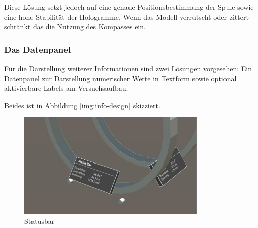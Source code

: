 Diese Lösung setzt jedoch auf eine genaue Positionsbestimmung der Spule sowie eine hohe Stabilität der Hologramme. Wenn das Modell verrutscht oder zittert schränkt das die Nutzung des Kompasses ein.

\subsubsection{Das Datenpanel} 
\label{sec-4-2-5}
Für die Darstellung weiterer Informationen sind zwei Lösungen vorgesehen: Ein Datenpanel zur Darstellung numerischer Werte in Textform sowie optional aktivierbare Labels am Versuchsaufbau.

Beides ist in Abbildung \ref{img:info-design} skizziert.


\begin{figure}[H]
\centering
\includegraphics[width=0.8\textwidth]{images/status.jpg}
\caption{Statusbar}
\label{img:status}
\end{figure}


\vspace{8px}
\begin{center}
	\\
\end{center}
\vspace{6px}

